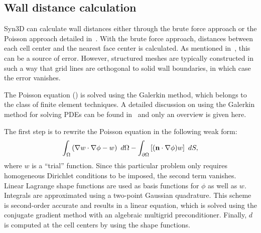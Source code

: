 \subsection{Wall distance calculation}
\label{sec:synwalldist}
Syn3D can calculate wall distances either through the brute force approach or the Poisson approach detailed in~. With the brute force approach, distances between each cell center and the nearest face center is calculated. As mentioned in~, this can be a source of error. However, structured meshes are typically constructed in such a way that grid lines are orthogonal to solid wall boundaries, in which case the error vanishes. 

The Poisson equation () is solved using the Galerkin method, which belongs to the class of finite element techniques. A detailed discussion on using the Galerkin method for solving PDEs can be found in~\cite{reddy2006introduction} and only an overview is given here. 

The first step is to rewrite the Poisson equation in the following weak form:
\begin{equation*}
    \int_\Omega \left(
        \nabla w\cdot\nabla\phi - w
    \right)~d\Omega
    - \int_{\partial \Omega} \left[
        (\mathbf{n}\cdot\nabla\phi)w
    \right]~dS,
\end{equation*}
where $w$ is a ``trial'' function. Since this particular problem only requires homogeneous Dirichlet conditions to be imposed, the second term vanishes. Linear Lagrange shape functions are used as basis functions for $\phi$ as well as $w$. Integrals are approximated using a two-point Gaussian quadrature. This scheme is second-order accurate and results in a linear equation, which is solved using the conjugate gradient method with an algebraic multigrid preconditioner. Finally, $d$ is computed at the cell centers by using the shape functions. 
